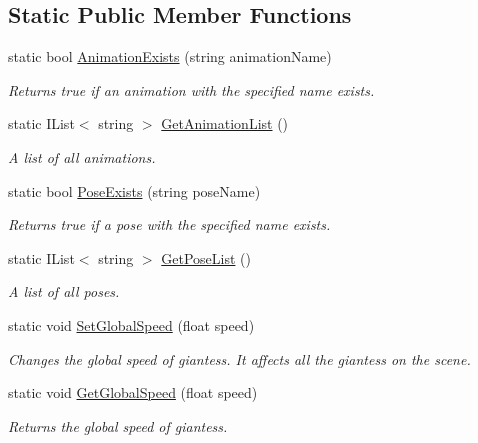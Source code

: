 \subsection*{Static Public Member Functions}
\begin{DoxyCompactItemize}
\item 
static bool \mbox{\hyperlink{class_lua_1_1_animation_a1002a4f745d48a64fd26affa514ee0d2}{Animation\+Exists}} (string animation\+Name)
\begin{DoxyCompactList}\small\item\em Returns true if an animation with the specified name exists. \end{DoxyCompactList}\item 
static I\+List$<$ string $>$ \mbox{\hyperlink{class_lua_1_1_animation_a62391765462757427af96fbde304ec23}{Get\+Animation\+List}} ()
\begin{DoxyCompactList}\small\item\em A list of all animations. \end{DoxyCompactList}\item 
static bool \mbox{\hyperlink{class_lua_1_1_animation_a7826d8216e7d202f625e697341ae62fc}{Pose\+Exists}} (string pose\+Name)
\begin{DoxyCompactList}\small\item\em Returns true if a pose with the specified name exists. \end{DoxyCompactList}\item 
static I\+List$<$ string $>$ \mbox{\hyperlink{class_lua_1_1_animation_aab1106afb022117d78df5cc01e426197}{Get\+Pose\+List}} ()
\begin{DoxyCompactList}\small\item\em A list of all poses. \end{DoxyCompactList}\item 
static void \mbox{\hyperlink{class_lua_1_1_animation_af1f4b9f2d2a3e595a08a7f5e5d095580}{Set\+Global\+Speed}} (float speed)
\begin{DoxyCompactList}\small\item\em Changes the global speed of giantess. It affects all the giantess on the scene. \end{DoxyCompactList}\item 
static void \mbox{\hyperlink{class_lua_1_1_animation_ad91c4ef8fcb303877802e1e38fd27b85}{Get\+Global\+Speed}} (float speed)
\begin{DoxyCompactList}\small\item\em Returns the global speed of giantess. \end{DoxyCompactList}\end{DoxyCompactItemize}
